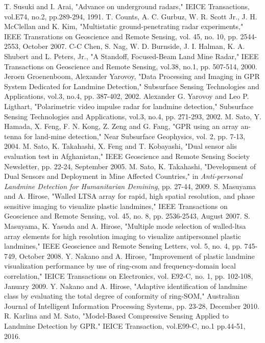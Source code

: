 \documentclass[uplatex,a4paper,10pt]{jsarticle}
\begin{document}
\begin{thebibliography}{99}
 T. Susuki and I. Arai, "Advance on underground radars," IEICE
Transactions, vol.E74, no.2, pp.289-294, 1991.
 T. Counts, A. C. Gurbuz, W. R. Scott Jr.,
        J. H. McClellan and K. Kim, "Multistatic
ground-penetrating radar experiments," IEEE Transrations on Geoscience and
Remote Sensing, vol. 45, no. 10, pp. 2544-2553, October 2007.
 C-C Chen, S. Nag, W. D. Burnside, J. I. Halman,
K. A. Shubert and L. Peters, Jr., "A Standoff, Focused-Beam Land Mine Radar,"
IEEE Transactions on Geoscience and Remote Sensing, vol.38, no.1, pp. 507-514, 2000.
 Jeroen Groenenboom, Alexander Yarovoy,
"Data Processing and Imaging in GPR System Dedicated for Landmine
Detection," Subsurface Sensing Technologies and Applications, vol.3,
        no.4, pp. 387-402, 2002.
 Alexander G. Yarovoy and  Leo P. Ligthart,
"Polarimetric video impulse radar for landmine detection,"
Subsurface Sensing Technologies and Applications, vol.3, no.4, pp. 271-293, 2002.
 M. Sato, Y. Hamada, X. Feng, F. N. Kong, Z. Zeng and
        G. Fang, "GPR using an array an-
tenna for land-mine detection," Near Subsurface Geophysics, vol. 2,
        pp. 7-13, 2004.
  M. Sato, K. Takahashi, X. Feng and
        T. Kobayashi, "Dual sensor alis evaluation test in
        Afghanistan," IEEE Geoscience and Remote Sensing Society
        Newsletter, pp. 22-24, September 2005.
  M. Sato, K. Takahashi, "Development of
        Dual Sensors and Deployment in Mine Affected
        Countries," in {\it Anti-personal Landmine Detection for
        Humanitarian Demining}, pp. 27-44, 2009.
 S. Masuyama and A. Hirose, "Walled LTSA array for rapid, high spatial resolution,
and phase sensitive imaging to visualize plastic landmines," IEEE Transactions
on Geoscience and Remote Sensing, vol. 45, no. 8, pp. 2536-2543, August 2007.
 S. Masuyama, K. Yasuda and A. Hirose, "Multiple mode selection of
walled-ltsa array elements for high resolution imaging to visualize antipersonnel
plastic landmines," IEEE Geoscience and Remote Sensing Letters, vol. 5,
        no. 4, pp. 745-749, October 2008.
 Y. Nakano and A. Hirose, "Improvement of plastic
        landmine visualization performance by use of ring-csom and
        frequency-domain local correlation," IEICE Transactions on
        Electronics, vol. E92-C, no. 1, pp. 102-108, January 2009.
 Y. Nakano and A. Hirose, "Adaptive identification of
        landmine class by evaluating the total degree of conformity of
        ring-SOM," Australian Journal of Intelligent Information
        Processing Systems, pp. 23-28, December 2010.
 R. Karlina and M. Sato, "Model-Based Compressive Sensing Applied to Landmine Detection by GPR." IEICE Transaction, vol.E99-C, no.1 pp.44-51, 2016.
\end{thebibliography}
\end{document}
